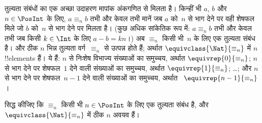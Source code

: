\documentclass[../../../include/open-logic-section]{subfiles}
\begin{document}
\begin{ex}
तुल्यता संबंधों का एक अच्छा उदाहरण मापांक अंकगणित से मिलता है। किन्हीं भी
$a$, $b$ और $n \in \PosInt$ के लिए, $a \equiv_n b$ तभी और केवल तभी मानें
जब $a$ को~$n$ से भाग देने पर वही शेषफल मिले जो $b$ को~$n$ से भाग देने पर
मिलता है। (कुछ अधिक सांकेतिक रूप में: $a \equiv_n b$ तभी और केवल तभी जब
किसी $k \in
\Int$ के लिए $a - b = kn$।) अब $\equiv_n$ किसी भी~$n$ के लिए एक तुल्यता
संबंध है। और ठीक $n$ भिन्न तुल्यता वर्ग~$\equiv_n$ से उत्पन्न होते हैं;
अर्थात $\equivclass{\Nat}{\equiv_n}$ में $n$ !!{element}s हैं। ये हैं:
$n$ से निःशेष विभाज्य संख्याओं का समुच्चय, अर्थात
$\equivrep{0}{\equiv_n}$; $n$ से भाग देने पर शेषफल~$1$ देने वाली संख्याओं
का समुच्चय, अर्थात $\equivrep{1}{\equiv_n}$; \ldots; और $n$ से भाग देने
पर शेषफल~$n-1$ देने वाली संख्याओं का समुच्चय, अर्थात
~$\equivrep{n-1}{\equiv_n}$।
\end{ex}

\begin{prob}
सिद्ध कीजिए कि $\equiv_n$ किसी भी $n \in
\PosInt$ के लिए एक तुल्यता संबंध है, और
$\equivclass{\Nat}{\equiv_n}$ में ठीक $n$ अवयव हैं।
\end{prob}
\end{document}
